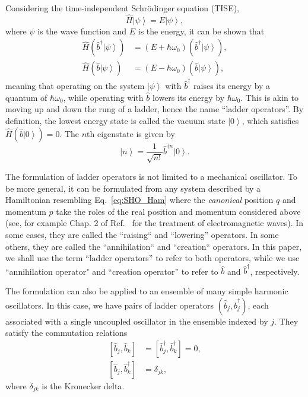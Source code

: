 \documentclass[5p, twocolumn, 10pt, sort&compress]{elsarticle}
\newcommand{\ket}[1]{\left|{#1}\right\rangle}
\newcommand{\comm}[2]{\left[{#1},{#2}\right]}
\newcommand{\bop}{\hat{b}}
\newcommand{\bdag}{\bop^\dagger}
\newcommand{\bdagn}[1]{\bop^{\dagger {#1}}}
\begin{document}
Considering the time-independent Schr\"{o}dinger equation (TISE),
\begin{equation}
    \hat{H}\ket{\psi} = E\ket{\psi},
\end{equation}
where $\psi$ is the wave function and $E$ is the energy, it can be shown that 
\begin{subequations}
    \begin{align}
        \hat{H}\left(\bdag\ket{\psi}\right) &= \left(E+\hbar\omega_0\right)\left(\bdag\ket{\psi}\right),
        \\
        \hat{H}\left(\bop\ket{\psi}\right) &= \left(E-\hbar\omega_0\right)\left(\bop\ket{\psi}\right),
    \end{align}
\end{subequations}
meaning that operating on the system $\ket{\psi}$ with $\bdag$ raises its energy by a quantum of $\hbar\omega_0$, while operating with $\bop$ lowers its energy by $\hbar\omega_0$.  This is akin to moving up and down the rung of a ladder, hence the name ``ladder operators''.  By definition, the lowest energy state is called the vacuum state $\ket{0}$, which satisfies $\hat{H}\left(\bop\ket{0}\right)=0$. The $n$th eigenstate is given by
\begin{equation}
    \ket{n} = \frac{1}{\sqrt{n!}}\bdagn{n}\ket{0}.
\end{equation}

The formulation of ladder operators is not limited to a mechanical oscillator. To be more general, it can be formulated from any system described by a Hamiltonian resembling Eq.~\eqref{eq:SHO_Ham} where the \emph{canonical} position $q$ and momentum $p$ take the roles of the real position and momentum considered above (see, for example Chap. 2 of Ref.~\cite{gerry_introductory_2005} for the treatment of electromagnetic waves).  In some cases, they are called the ``raising`` and ``lowering'' operators.  In some others, they are called the ``annihilation`` and ``creation`` operators.  In this paper, we shall use the term ``ladder operators'' to refer to both operators, while we use ``annihilation operator" and ``creation operator'' to refer to $\bop$ and $\bdag$, respectively.

The formulation can also be applied to an ensemble of many simple harmonic oscillators.  In this case, we have pairs of ladder operators $\left(\bop_j,\bdag_j\right)$, each associated with a single uncoupled oscillator in the ensemble indexed by $j$.  They satisfy the commutation relations
\begin{subequations}
\begin{align}
    \comm{\bop_j}{\bop_k} &= \comm{\bdag_j}{\bdag_k} = 0
    \label{eq:boson_comm_1},
    \\
    \comm{\bop_j}{\bdag_k} &= \delta_{jk},
    \label{eq:boson_comm_2}
\end{align}
\end{subequations}
where $\delta_{jk}$ is the Kronecker delta. 
\end{document}
